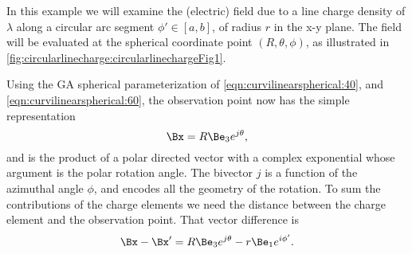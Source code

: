 %
%
In this example we will examine the (electric) field due to a line charge density of \( \lambda \) along a circular arc segment \( \phi' \in [a,b] \), of radius \( r \) in the x-y plane.
The field will be evaluated at the
spherical coordinate point \( (R, \theta, \phi) \), as illustrated in \cref{fig:circularlinecharge:circularlinechargeFig1}.

Using the GA spherical parameterization of \cref{eqn:curvilinearspherical:40}, and \cref{eqn:curvilinearspherical:60}, the
%
%
%
%
observation point now has the simple representation
\begin{equation}\label{eqn:circularlinecharge:60}
\Bx = R \Be_3 e^{j \theta },
\end{equation}
and is the product of a polar directed vector with a complex exponential whose argument is the polar rotation angle.
The bivector \( j \) is a function of the azimuthal angle \( \phi \), and encodes all the geometry of the rotation.
To sum the contributions of the charge elements we need the distance between the charge element and the observation point.
That vector difference is
\begin{equation}\label{eqn:circularlinecharge:80}
\Bx - \Bx'
=
R \Be_3 e^{j \theta } - r \Be_1 e^{i \phi'}.
\end{equation}

